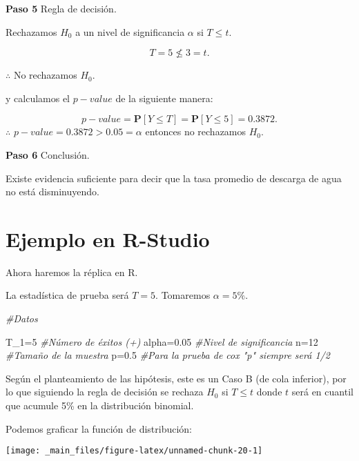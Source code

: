 \documentclass[
  a4paper,
  oneside,
  openany]{book}
\newenvironment{Shaded}{\begin{snugshade}}{\end{snugshade}}
\newcommand{\CommentTok}[1]{\textcolor[rgb]{0.56,0.35,0.01}{\textit{#1}}}
\newcommand{\DecValTok}[1]{\textcolor[rgb]{0.00,0.00,0.81}{#1}}
\newcommand{\FloatTok}[1]{\textcolor[rgb]{0.00,0.00,0.81}{#1}}
\newcommand{\NormalTok}[1]{#1}
\newcommand{\OtherTok}[1]{\textcolor[rgb]{0.56,0.35,0.01}{#1}}
\begin{document}
\textbf{Paso 5} Regla de decisión.

Rechazamos \(H_0\) a un nivel de significancia \(\alpha\) si \(T \leq t.\)

\[T=5 \nleq 3=t.\]

\(\therefore\) No rechazamos \(H_0.\)

y calculamos el \(p-value\) de la siguiente manera:

\[p-value=\mathbf{P}[Y\leq T]=\mathbf{P}[Y\leq 5]=0.3872.\]
\(\therefore\) \(p-value=0.3872>0.05=\alpha\) entonces no rechazamos \(H_0\).

\textbf{Paso 6} Conclusión.

Existe evidencia suficiente para decir que la tasa promedio de descarga de agua no está disminuyendo.

\hypertarget{ejemplo-en-r-studio-4}{%
\section{Ejemplo en R-Studio}\label{ejemplo-en-r-studio-4}}

Ahora haremos la réplica en R.

La estadística de prueba será \(T=5\). Tomaremos \(\alpha=5\%.\)

\begin{Shaded}
\begin{Highlighting}[]
\CommentTok{\#Datos}

\NormalTok{T\_1}\OtherTok{=}\DecValTok{5}              \CommentTok{\#Número de éxitos (+)}
\NormalTok{alpha}\OtherTok{=}\FloatTok{0.05}       \CommentTok{\#Nivel de significancia}
\NormalTok{n}\OtherTok{=}\DecValTok{12}              \CommentTok{\#Tamaño de la muestra }
\NormalTok{p}\OtherTok{=}\FloatTok{0.5}            \CommentTok{\#Para la prueba de cox "p" siempre será 1/2}
\end{Highlighting}
\end{Shaded}

Según el planteamiento de las hipótesis, este es un Caso B (de cola inferior), por lo que siguiendo la regla de decisión se rechaza \(H_0\) si \(T\leq t\) donde \(t\) será en cuantil que acumule 5\% en la distribución binomial.

\break

Podemos graficar la función de distribución:

\begin{center}\texttt{[image: \_main\_files/figure-latex/unnamed-chunk-20-1]} \end{center}
\end{document}
